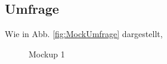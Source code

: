 \subsection{Umfrage}
\label{ssec:Umfrage}
Wie in Abb. \vref{fig:MockUmfrage} dargestellt, 


\begin{figure}
	\caption[Mockup 1]{Mockup 1 \\ \quelle}
	\label{fig:MockUmfrage}
\end{figure}